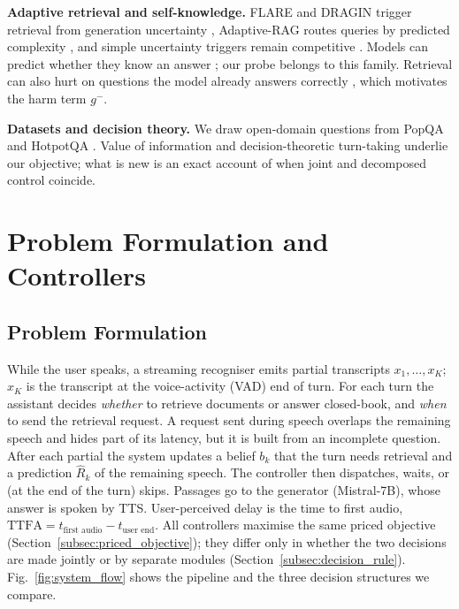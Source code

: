 \textbf{Adaptive retrieval and self-knowledge.} FLARE and DRAGIN trigger
retrieval from generation uncertainty \cite{jiang2023flare,su2024dragin},
Adaptive-RAG routes queries by predicted complexity \cite{jeong2024adaptiverag},
and simple uncertainty triggers remain competitive
\cite{moskvoretskii2025adaptive}. Models can predict whether they know an
answer \cite{kadavath2022language}; our probe belongs to this family.
Retrieval can also hurt on questions the model already answers correctly
\cite{mallen2023trust}, which motivates the harm term $g^{-}$.

\textbf{Datasets and decision theory.} We draw open-domain questions from
PopQA \cite{mallen2023trust} and HotpotQA \cite{yang2018hotpotqa}. Value of
information \cite{howard1966information} and decision-theoretic turn-taking
\cite{bohus2011decisions} underlie our objective; what is new is an exact
account of when joint and decomposed control coincide.

\section{Problem Formulation and Controllers}
\label{sec:problem}

\subsection{Problem Formulation}
\label{subsec:problem_formulation}

While the user speaks, a streaming recogniser emits partial transcripts
$x_1,\dots,x_K$; $x_K$ is the transcript at the voice-activity (VAD) end of
turn. For each turn the assistant decides \emph{whether} to retrieve
documents or answer closed-book, and \emph{when} to send the retrieval
request. A request sent during speech overlaps the remaining speech and hides
part of its latency, but it is built from an incomplete question. After each
partial the system updates a belief $b_k$ that the turn needs retrieval and a
prediction $\hat R_k$ of the remaining speech. The controller then
dispatches, waits, or (at the end of the turn) skips. Passages go to the
generator (Mistral-7B), whose answer is spoken by TTS. User-perceived delay
is the time to first audio,
$\mathrm{TTFA}=t_{\text{first audio}}-t_{\text{user end}}$.
All controllers maximise the same priced objective
(Section~\ref{subsec:priced_objective}); they differ only in whether the two
decisions are made jointly or by separate modules
(Section~\ref{subsec:decision_rule}). Fig.~\ref{fig:system_flow} shows the
pipeline and the three decision structures we compare.

